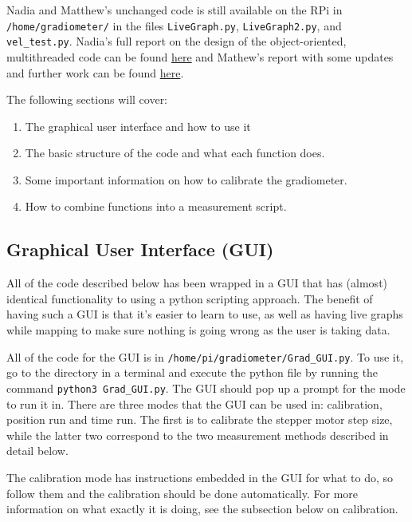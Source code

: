 \documentclass{TheMartianReport}
\newcommand{\shellinline}[1]{\texttt{#1}}
\begin{document}
Nadia and Matthew's unchanged code is still available on the RPi in \shellinline{/home/gradiometer/} in the files \shellinline{LiveGraph.py}, \shellinline{LiveGraph2.py}, and \shellinline{vel_test.py}. Nadia's full report on the design of the object-oriented, multithreaded code can be found \href{https://ucn.triumf.ca/edm/magnetic-shielding/gradiometer-setup-at-triumf/TRIUMF%20Final%20Report%20Chigmaroff.pdf/view}{here} and Mathew's report with some updates and further work can be found \href{https://ucn.triumf.ca/edm/magnetic-shielding/gradiometer-setup-at-triumf/Gradiometer_Report.pdf/view}{here}.

The following sections will cover:
\begin{enumerate}
	\item The graphical user interface and how to use it
	\item The basic structure of the code and what each function does.
	\item Some important information on how to calibrate the gradiometer.
	\item How to combine functions into a measurement script.
\end{enumerate}
\subsection{Graphical User Interface (GUI)} \label{subsec:GUI}
All of the code described below has been wrapped in a GUI that has (almost) identical functionality to using a python scripting approach. The benefit of having such a GUI is that it's easier to learn to use, as well as having live graphs while mapping to make sure nothing is going wrong as the user is taking data. 

All of the code for the GUI is in \shellinline{/home/pi/gradiometer/Grad_GUI.py}. To use it, go to the directory in a terminal and execute the python file by running the command \shellinline{python3 Grad_GUI.py}. The GUI should pop up a prompt for the mode to run it in. There are three modes that the GUI can be used in: calibration, position run and time run. The first is to calibrate the stepper motor step size, while the latter two correspond to the two measurement methods described in detail below. 

The calibration mode has instructions embedded in the GUI for what to do, so follow them and the calibration should be done automatically. For more information on what exactly it is doing, see the subsection below on calibration. 
\end{document}

